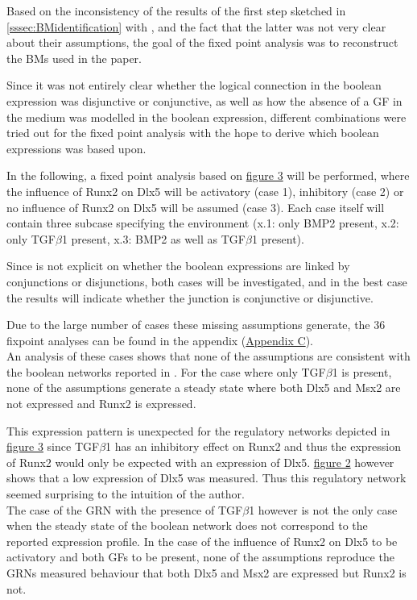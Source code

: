 \documentclass[11pt]{article}
\begin{document}
Based on the inconsistency of the results of the first step sketched in \ref{sssec:BMidentification} with \cite{Kirkham}, and the fact that the latter was not very clear about their assumptions, the goal of the fixed point analysis was to reconstruct the BMs used in the paper. 

Since it was not entirely clear whether the logical connection in the boolean expression was disjunctive or conjunctive, as well as how the absence of a GF in the medium was modelled in the boolean expression, different combinations were tried out for the fixed point analysis with the hope to derive which boolean expressions \cite{Kirkham} was based upon.

In the following, a fixed point analysis based on \hyperref[FPGRNs]{figure 3} will be performed, where the influence of Runx2 on Dlx5 will be activatory (case 1), inhibitory (case 2) or no influence of Runx2 on Dlx5 will be assumed (case 3).
Each case itself will contain three subcase specifying the environment (x.1: only BMP2 present, x.2: only TGF$\beta$1 present, x.3: BMP2 as well as TGF$\beta$1 present).

Since \cite{Kirkham} is not explicit on whether the boolean expressions are linked by conjunctions or disjunctions, both cases will be investigated, and in the best case the results will indicate whether the junction is conjunctive or disjunctive.

Due to the large number of cases these missing assumptions generate, the 36 fixpoint analyses can be found in the appendix (\hyperref[AppendixC]{Appendix C}). \\

An analysis of these cases shows that none of the assumptions are consistent with the boolean networks reported in \cite{Kirkham}. For the case where only TGF$\beta$1 is present, none of the assumptions generate a steady state where both Dlx5 and Msx2 are not expressed and Runx2 is expressed.

This expression pattern is unexpected for the regulatory networks depicted in \hyperref[FPGRNs]{figure 3} since TGF$\beta$1 has an inhibitory effect on Runx2 and thus the expression of Runx2 would only be expected with an expression of Dlx5. 
\hyperref[table1]{figure 2} however shows that a low expression of Dlx5 was measured. 
Thus this regulatory network seemed surprising to the intuition of the author. \\

The case of the GRN with the presence of TGF$\beta$1 however is not the only case when the steady state of the boolean network does not correspond to the reported expression profile.
In the case of the influence of Runx2 on Dlx5 to be activatory and both GFs to be present, none of the assumptions reproduce the GRNs measured behaviour that both Dlx5 and Msx2 are expressed but Runx2 is not. 
\end{document}
